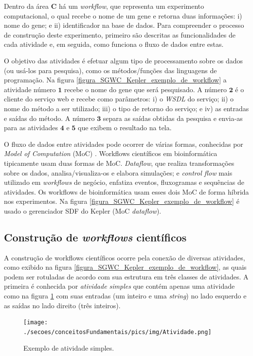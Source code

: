 Dentro da área \textbf{C} há um \emph{workf\mbox{}low}, que representa um experimento computacional, o qual recebe o nome de um gene e retorna duas informações: i) nome do gene; e ii) identificador na base de dados. Para compreender o processo de construção deste experimento, primeiro são descritas as funcionalidades de cada atividade e, em seguida, como funciona o fluxo de dados entre estas.

O objetivo das atividades é efetuar algum tipo de processamento sobre os dados (ou usá-los para pesquisa), como os métodos/funções das linguagens de programação. Na figura \ref{figura_SGWC_Kepler_exemplo_de_workflow} a atividade número \(\mathbf{1}\) recebe o nome do gene que será pesquisado. A número \(\mathbf{2}\) é o cliente do serviço web e recebe como parâmetros: i) o \emph{WSDL} do serviço; ii) o nome do método a ser utilizado; iii) o tipo de retorno do serviço; e iv) as entradas e saídas do método. A número \(\mathbf{3}\) separa as saídas obtidas da pesquisa e envia-as para as atividades \(\mathbf{4}\) e \(\mathbf{5}\) que exibem o resultado na tela.

O fluxo de dados entre atividades pode ocorrer de várias formas, conhecidas por \emph{Model of Computation} (MoC) \cite{Ludascher2006}. Workflows científicos em bioinformática tipicamente usam duas formas de MoC. \emph{Dataflow}, que realiza transformações sobre os dados, analisa/visualiza-os e elabora simulações; e \emph{control flow} mais utilizado em \emph{workflows} de negócio, enfatiza eventos, fluxogramas e sequências de atividades. Os workflows de bioinformática usam esses dois MoC de forma híbrida nos experimentos. Na figura \ref{figura_SGWC_Kepler_exemplo_de_workflow} é usado o gerenciador SDF do Kepler (MoC \emph{dataflow}).

\subsection{Construção de \emph{workf\mbox{}lows} científ\mbox{}icos}
A construção de workflows científicos ocorre pela conexão de diversas atividades, como exibido na figura \ref{figura_SGWC_Kepler_exemplo_de_workflow}, as quais podem ser rotuladas de acordo com sua estrutura em três classes de atividades. A primeira é conhecida por \emph{atividade simples} que contém apenas uma atividade  \cite{Garijo2012} como na figura \ref{figura_atividade_simples} com suas entradas (um inteiro e uma \emph{string}) no lado esquerdo e as saídas no lado direito (três inteiros).
\begin{figure}[!hbt]
    \centering  
    \caption{Exemplo de atividade simples.}
    \texttt{[image: ./secoes/conceitosFundamentais/pics/img/Atividade.png]}    
	\label{figura_atividade_simples}
\end{figure}

